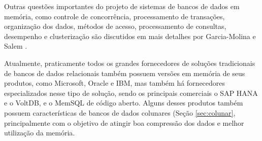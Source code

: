 Outras questões importantes do projeto de sistemas de bancos de dados em memória, como controle de concorrência, processamento de transações, organização dos dados, métodos de acesso, processamento de consultas, desempenho e clusterização são discutidos em mais detalhes por Garcia-Molina e Salem \cite{garcia1992main}.

Atualmente, praticamente todos os grandes fornecedores de soluções tradicionais de bancos de dados 
relacionais também possuem versões em memória de seus produtos, como Microsoft, Oracle e IBM, mas 
também há fornecedores especializados nesse tipo de solução, sendo os principais comerciais o SAP HANA
e o VoltDB, e o MemSQL de código aberto. Alguns desses produtos também possuem 
características de bancos de dados colunares (Seção \ref{sec:colunar}, principalmente com o objetivo 
de atingir boa compressão dos dados e melhor utilização da memória.





